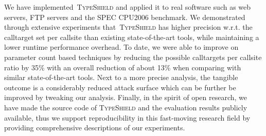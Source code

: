 We have implemented~\textsc{TypeShield} and applied it to real software such as web servers, FTP servers and the SPEC CPU2006 benchmark. 
We demonstrated through extensive experiments that~\textsc{TypeShield} has 
higher precision w.r.t. the calltarget set per callsite than existing state-of-the-art tools, while maintaining a lower runtime performance overhead. 
To date, we were able to improve on parameter count based techniques by reducing the possible calltargets per 
callsite ratio by 35\% with an overall reduction of about 13\% when comparing with similar state-of-the-art tools. 
Next to a more precise analysis, the tangible outcome is a considerably reduced attack surface which can be further be improved by 
tweaking our analysis. Finally, in the spirit of open research, we have made the source code of \textsc{TypeShield} and the evaluation results publicly available, 
thus we support reproducibility in this fast-moving research field by providing comprehensive descriptions of our experiments.


